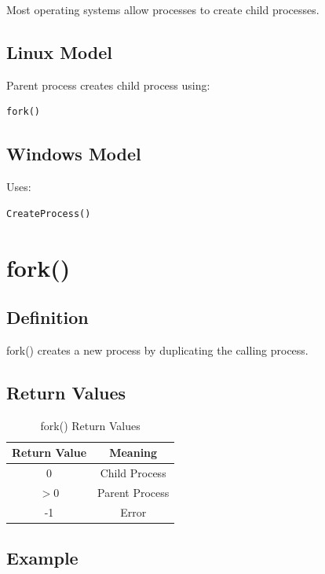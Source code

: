 Most operating systems allow processes to create child processes.

\subsection{Linux Model}

Parent process creates child process using:

\begin{verbatim}
fork()
\end{verbatim}

\subsection{Windows Model}

Uses:

\begin{verbatim}
CreateProcess()
\end{verbatim}

\section{fork()}

\subsection{Definition}

fork() creates a new process by duplicating the calling process.

\subsection{Return Values}

\begin{table}[H]
\centering
\begin{tabular}{|c|c|}
\hline
Return Value & Meaning \\
\hline
0 & Child Process \\
\hline
$>$0 & Parent Process \\
\hline
-1 & Error \\
\hline
\end{tabular}
\caption{fork() Return Values}
\end{table}

\subsection{Example}

